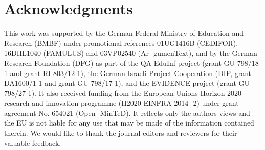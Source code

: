 \documentclass[smallcondensed,natbib]{svjour3}     %
\begin{document}
\begin{abstract}
\end{abstract}

%






%




\section*{Acknowledgments}

This work was supported by the German Federal Ministry of Education and Research (BMBF) 
under promotional references 01UG1416B (CEDIFOR), 16DHL1040 (FAMULUS) and 03VP02540 (Ar-
gumenText),
and by the German Research Foundation (DFG) as part of 
the QA-EduInf project (grant GU 798/18-1 and grant RI 803/12-1), 
the German-Israeli Project Cooperation (DIP, grant DA1600/1-1 and grant GU 798/17-1), 
and the EVIDENCE project (grant GU 798/27-1). 
It also received funding
from the European Unions Horizon 2020 research
and innovation programme (H2020-EINFRA-2014-
2) under grant agreement No. 654021 (Open-
MinTeD). It reflects only the authors views and the
EU is not liable for any use that may be made of
the information contained therein. We would like to
thank the journal editors and reviewers for their valuable feedback.




\appendix


\end{document}
